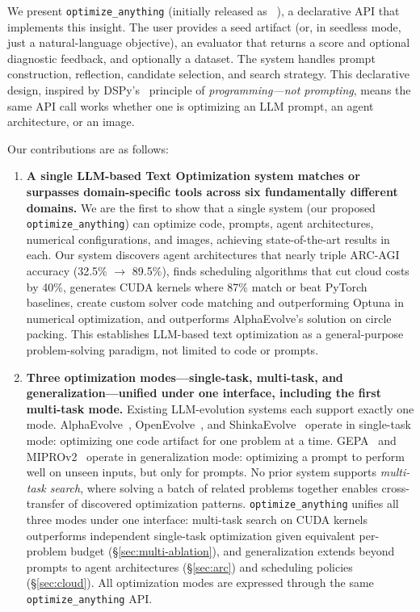 \documentclass[sigconf]{acmart}
\newcommand{\oa}{\texttt{optimize\_anything}}
\begin{document}
We present \oa{} (initially released as ~\citet{agrawal2026oa_blog}), a declarative API that implements this insight. The user provides a seed artifact (or, in seedless mode, just a natural-language objective), an evaluator that returns a score and optional diagnostic feedback, and optionally a dataset. The system handles prompt construction, reflection, candidate selection, and search strategy. This declarative design, inspired by DSPy's~\cite{khattab2023dspy} principle of \emph{programming---not prompting}, means the same API call works whether one is optimizing an LLM prompt, an agent architecture, or an image.

Our contributions are as follows:

\begin{enumerate}[leftmargin=*,itemsep=2pt]
\item \textbf{A single LLM-based Text Optimization system matches or surpasses domain-specific tools across six fundamentally different domains.} We are the first to show that a single system (our proposed \oa{}) can optimize code, prompts, agent architectures, numerical configurations, and images, achieving state-of-the-art results in each. Our system discovers agent architectures that nearly triple ARC-AGI accuracy (32.5\% $\to$ 89.5\%), finds scheduling algorithms that cut cloud costs by 40\%, generates CUDA kernels where 87\% match or beat PyTorch baselines, create custom solver code matching and outperforming Optuna in numerical optimization, and outperforms AlphaEvolve's solution on circle packing. This establishes LLM-based text optimization as a general-purpose problem-solving paradigm, not limited to code or prompts.

\item \textbf{Three optimization modes---single-task, multi-task, and generalization---unified under one interface, including the first multi-task mode.} Existing LLM-evolution systems each support exactly one mode. AlphaEvolve~\cite{alphaevolve2025}, OpenEvolve~\cite{openevolve2025}, and ShinkaEvolve~\cite{shinkaevolve2025} operate in single-task mode: optimizing one code artifact for one problem at a time. GEPA~\cite{agrawal2026gepa} and MIPROv2~\cite{opsahl2024miprov2} operate in generalization mode: optimizing a prompt to perform well on unseen inputs, but only for prompts. No prior system supports \emph{multi-task search}, where solving a batch of related problems together enables cross-transfer of discovered optimization patterns. \oa{} unifies all three modes under one interface: multi-task search on CUDA kernels outperforms independent single-task optimization given equivalent per-problem budget (\S\ref{sec:multi-ablation}), and generalization extends beyond prompts to agent architectures (\S\ref{sec:arc}) and scheduling policies (\S\ref{sec:cloud}). All optimization modes are expressed through the same \oa{} API.


\end{enumerate}
\end{document}
